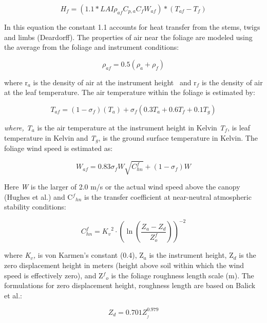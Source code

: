\begin{equation}
{H_f} = (1.1*LAI{\rho_{af}}{C_{p,a}}{C_f}{W_{af}})*({T_{af}} - {T_f})
\end{equation}

In this equation the constant 1.1 accounts for heat transfer from the stems, twigs and limbs (Deardorff). The properties of air near the foliage are modeled using the average from the foliage and instrument conditions:

\begin{equation}
{\rho_{af}} = 0.5({\rho_a} + {\rho_f})
\end{equation}

where r\(_{a}\) is the density of air at the instrument height ~and r\(_{f}\) is the density of air at the leaf temperature. The air temperature within the foliage is estimated by:

\begin{equation}
{T_{af}} = (1 - {\sigma_f})({T_a}) + {\sigma_f}\left( {0.3{T_a} + 0.6{T_f} + 0.1{T_g}} \right)
\end{equation}

\emph{where, T\(_{a}\)} is the air temperature at the instrument height in Kelvin \emph{T\(_{f}\)}, is leaf temperature in Kelvin and \emph{T\(_{g}\)}, is the ground surface temperature in Kelvin. The foliage wind speed is estimated as:

\begin{equation}
{W_{af}} = 0.83{\sigma_f}W\sqrt {C_{hn}^f}  + (1 - {\sigma_f})W
\end{equation}

Here \emph{W} is the larger of 2.0 m/s or the actual wind speed above the canopy (Hughes et al.) and C\(^{f}\)\(_{hn}\) is the transfer coefficient at near-neutral atmospheric stability conditions:

\begin{equation}
C_{hn}^f = {K_v}^2 \cdot {\left( {\ln \left( {\frac{{{Z_a} - {Z_d}}}{{Z_o^f}}} \right)} \right)^{ - 2}}
\end{equation}

where \emph{K\(_{v}\),} is von Karmen's constant (0.4), Z\(_{a}\) is the instrument height, Z\(_{d}\) is the zero displacement height in meters (height above soil within which the wind speed is effectively zero), and Z\(^{f}\)\(_{o}\) is the foliage roughness length scale (m). The formulations for zero displacement height, roughness length are based on Balick et al.:

\begin{equation}
{Z_d} = 0.701Z_{_f}^{0.979}
\end{equation}

